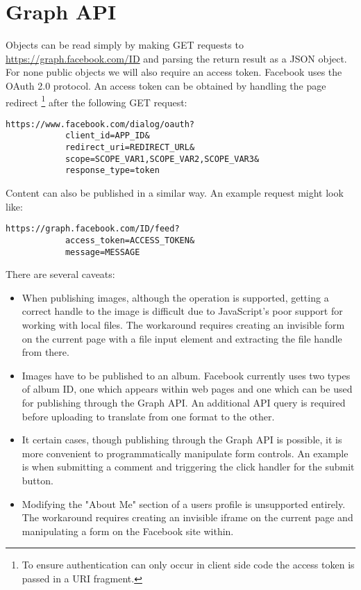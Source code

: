 \chapter{Graph API}
\label{app:graph}

Objects can be read simply by making GET requests to \url{https://graph.facebook.com/ID} and parsing the return result as a JSON object. For none public objects we will also require an access token. Facebook uses the OAuth 2.0 protocol. An access token can be obtained by handling the page redirect \footnote{To ensure authentication can only occur in client side code the access token is passed in a URI fragment.} after the following GET request:

\FloatBarrier
    \begin{lstlisting}[label=code:auth,caption=Authentication request,float=h]
        https://www.facebook.com/dialog/oauth?
            client_id=APP_ID&
            redirect_uri=REDIRECT_URL&
            scope=SCOPE_VAR1,SCOPE_VAR2,SCOPE_VAR3&
            response_type=token
    \end{lstlisting}
\FloatBarrier

    
Content can also be published in a similar way. An example request might look like:

\FloatBarrier
    \begin{lstlisting}[label=code:pub,caption=Publishing request,float=h]
        https://graph.facebook.com/ID/feed?
            access_token=ACCESS_TOKEN&
            message=MESSAGE
    \end{lstlisting}
\FloatBarrier      

There are several caveats:

\begin{itemize}

    \item When publishing images, although the operation is supported, getting a correct handle to the image is difficult due to JavaScript's poor support for working with local files. The workaround requires creating an invisible form on the current page with a file input element and extracting the file handle from there.

    \item Images have to be published to an album. Facebook currently uses two types of album ID, one which appears within web pages and one which can be used for publishing through the Graph API. An additional API query is required before uploading to translate from one format to the other.
    
    \item It certain cases, though publishing through the Graph API is possible, it is more convenient to programmatically manipulate form controls. An example is when submitting a comment and triggering the click handler for the submit button.
    
    \item Modifying the "About Me" section of a users profile is unsupported entirely. The workaround requires creating an invisible iframe on the current page and manipulating a form on the Facebook site within.

\end{itemize}